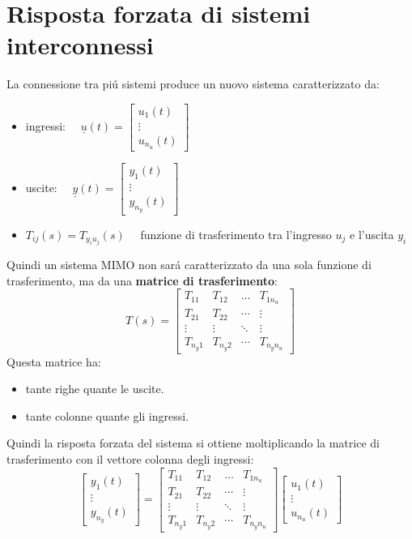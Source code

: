 \documentclass[../main.tex]{subfiles}
\begin{document}
	\section{Risposta forzata di sistemi interconnessi}
		La connessione tra pi\'u sistemi produce un nuovo sistema caratterizzato da:
		\begin{itemize}
			\item 
				ingressi: $ \quad \underline{u}(t) = \left[ 
				\begin{smallmatrix} 
					u_1(t)
					\\
					\vdots
					\\
					u_{n_u}(t)
				\end{smallmatrix} \right] $
			\item 
				uscite: $ \quad \underline{y}(t) = \left[ 
				\begin{smallmatrix}
					y_1(t)
					\\
					\vdots
					\\
					y_{n_y}(t)
				\end{smallmatrix} \right] $
			\item 
				$ T_{ij}(s) = T_{y_i u_j}(s) \quad $ funzione di trasferimento tra l'ingresso $ u_j $ e l'uscita $ y_i $
		\end{itemize}
		Quindi un sistema MIMO non sar\'a caratterizzato da una sola funzione di trasferimento, ma da una \textbf{matrice di trasferimento}:
		\[
			T(s) =
			\begin{bmatrix}
				T_{11} & T_{12} & \dots & T_{1n_u} \\ 
				T_{21} & T_{22} & \cdots & \vdots \\ 
				\vdots & \vdots & \ddots & \vdots \\ 
				T_{n_y1}& T_{n_y2} & \cdots & T_{n_yn_u} 
			\end{bmatrix}
		\]
		Questa matrice ha:
		\begin{itemize}
			\item tante righe quante le uscite.
			\item tante colonne quante gli ingressi.
		\end{itemize}
		Quindi la risposta forzata del sistema si ottiene moltiplicando la matrice di trasferimento con il vettore colonna degli ingressi:
		\[ 
			\begin{bmatrix}
				y_1(t)
				\\[1em]
				\vdots
				\\[1em]
				y_{n_y}(t)
			\end{bmatrix} =
			\begin{bmatrix}
				T_{11} & T_{12} & \dots & T_{1 n_u} \\ 
				T_{21} & T_{22} & \cdots & \vdots \\ 
				\vdots & \vdots & \ddots & \vdots \\ 
				T_{n_y 1}& T_{n_y 2} & \cdots & T_{n_y n_u} 
			\end{bmatrix}
			\begin{bmatrix}
				u_1(t)
				\\[1em]
				\vdots
				\\[1em]
				u_{n_u}(t)
			\end{bmatrix}
		\]
		
\end{document}
